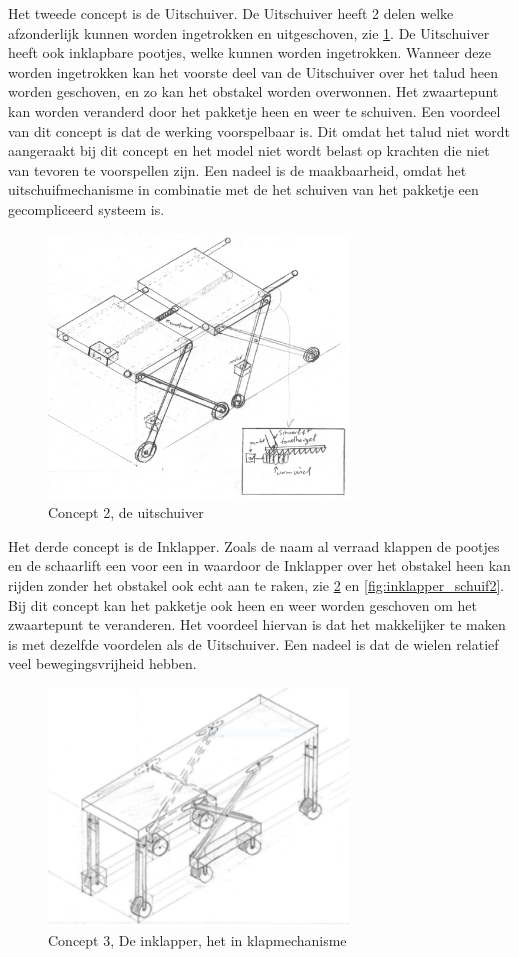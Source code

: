 Het tweede concept is de Uitschuiver. De Uitschuiver heeft 2 delen welke afzonderlijk kunnen worden ingetrokken en uitgeschoven, zie \cref{fig:isom_uitschuiver2}. De Uitschuiver heeft ook inklapbare pootjes, welke kunnen worden ingetrokken. Wanneer deze worden ingetrokken kan het voorste deel van de Uitschuiver over het talud heen worden geschoven, en zo kan het obstakel worden overwonnen. Het zwaartepunt kan worden veranderd door het pakketje heen en weer te schuiven. Een voordeel van dit concept is dat de werking voorspelbaar is. Dit omdat het talud niet wordt aangeraakt bij dit concept en het model niet wordt belast op krachten die niet van tevoren te voorspellen zijn. Een nadeel is de maakbaarheid, omdat het uitschuifmechanisme in combinatie met de het schuiven van het pakketje een gecompliceerd systeem is.

\begin{figure}[!htp]
    \centering
    \includegraphics[width=80mm]{04_idee_ontwikkeling/isom_uitschuiver.png}
    \caption{Concept 2, de uitschuiver}
    \label{fig:isom_uitschuiver2}
\end{figure}

Het derde concept is de Inklapper. Zoals de naam al verraad klappen de pootjes en de schaarlift een voor een in waardoor de Inklapper over het obstakel heen kan rijden zonder het obstakel ook echt aan te raken, zie \cref{fig:inklapper2} en \cref{fig:inklapper_schuif2}. Bij dit concept kan het pakketje ook heen en weer worden geschoven om het zwaartepunt te veranderen. Het voordeel hiervan is dat het makkelijker te maken is met dezelfde voordelen als de Uitschuiver. Een nadeel is dat de wielen relatief veel bewegingsvrijheid hebben. 

\begin{figure}[H]
    \centering
    \includegraphics[width = 80mm]{Foto_inklapper.PNG}
    \caption{Concept 3, De inklapper, het in klapmechanisme}
    \label{fig:inklapper2}
\end{figure}

